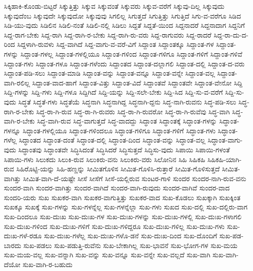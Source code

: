 {ಸಿಕ್ಕಿಹಾಕಿ-ಕೊಂಡು-ಬಿಟ್ಟರೆ
ಸಿಕ್ಕುತ್ತಿತ್ತು
ಸಿಕ್ಕುವ
ಸಿಕ್ಕುವಂತೆ
ಸಿಕ್ಕುವರು
ಸಿಕ್ಕುವ-ವರೆಗೆ
ಸಿಕ್ಕುವು-ದಿಲ್ಲ
ಸಿಕ್ಕುವುದು
ಸಿಕ್ಕುವುದೆಂಬ
ಸಿಕ್ಕುವುದೇ
ಸಿಕ್ಕುವುದೋ
ಸಿಕ್ಕುವುವು
ಸಿಗಲಿಲ್ಲ
ಸಿಗುತ್ತದೆ
ಸಿಗುತ್ತಿತ್ತು
ಸಿಗುತ್ತಿದೆ
ಸಿಗು-ವ-ವರೆಗೂ
ಸಿಡಿದ
ಸಿಡಿ-ಯು-ವುದು
ಸಿಡಿಲಿನ
ಸಿಡಿಲಿ-ನಂತೆ
ಸಿಡಿಲಿ-ನಲ್ಲಿ
ಸಿಡಿಲು
ಸಿದ್ದತೆ
ಸಿದ್ದತೆ-ಯಿಂದ
ಸಿದ್ದನಾದರೆ
ಸಿದ್ದನಾದಾಗ
ಸಿದ್ದನಿಗೆ
ಸಿದ್ದ-ರಾಗ-ಬೇಕು
ಸಿದ್ದ-ರಾಗಿ
ಸಿದ್ದ-ರಾಗಿ-ರ-ಬೇಕು
ಸಿದ್ದ-ರಾಗಿ-ರು-ವರು
ಸಿದ್ದ-ರಾಗುವರು
ಸಿದ್ದ-ರಾದರೆ
ಸಿದ್ದ-ರಾ-ದು-ದ-ರಿಂದ
ಸಿದ್ದಳಾಗಿ-ರುವಳು
ಸಿದ್ದ-ವಾಗಿದೆ
ಸಿದ್ದ-ವಾಗು-ವ-ವರೆ-ವಿಗೆ
ಸಿದ್ದಾಂತ
ಸಿದ್ದಾಂತಕ್ಕೂ
ಸಿದ್ದಾಂತ-ಗಳ
ಸಿದ್ದಾಂತ-ಗಳನ್ನು
ಸಿದ್ದಾಂತ-ಗಳಲ್ಲ
ಸಿದ್ದಾಂತ-ಗಳಲ್ಲಿಯೂ
ಸಿದ್ದಾಂತ-ಗಳಿಂದ
ಸಿದ್ದಾಂತ-ಗಳಿಗೂ
ಸಿದ್ದಾಂತ-ಗಳಿಗೆ
ಸಿದ್ದಾಂತ-ಗಳಿವೆ
ಸಿದ್ದಾಂತ-ಗಳು
ಸಿದ್ದಾಂತ-ಗಳೂ
ಸಿದ್ದಾಂತ-ಗಳೆಂದು
ಸಿದ್ದಾಂತದ
ಸಿದ್ದಾಂತ-ದಲ್ಲಾಗಲಿ
ಸಿದ್ದಾಂತ-ದಲ್ಲಿ
ಸಿದ್ದಾಂತ-ದ-ವರು
ಸಿದ್ದಾಂತ-ಪಡಿ-ಸಲು
ಸಿದ್ದಾಂತ-ಮಾಡಿ
ಸಿದ್ದಾಂತ-ವನ್ನು
ಸಿದ್ದಾಂತ-ವನ್ನೂ
ಸಿದ್ದಾಂತ-ವನ್ನೇ
ಸಿದ್ದಾಂತ-ವಲ್ಲ
ಸಿದ್ದಾಂತ-ವಾಗಿ-ರಲಿಲ್ಲ
ಸಿದ್ದಾಂತ-ವಾದ-ಹಾಗೆ
ಸಿದ್ದಾಂತ-ವಿತ್ತು
ಸಿದ್ದಾಂತ-ವಿದೆ
ಸಿದ್ದಾಂತವೆ
ಸಿದ್ದಾಂತವೇ
ಸಿದ್ದಾಂತ-ವೇನೋ
ಸಿದ್ದಿ
ಸಿದ್ದಿ-ಗಳನ್ನು
ಸಿದ್ದಿ-ಗಳು
ಸಿದ್ದಿ-ಗಳೂ
ಸಿದ್ದಿಗಿದೆ
ಸಿದ್ದಿ-ಯನ್ನು
ಸಿದ್ದಿ-ಸಲೇ-ಬೇಕು
ಸಿದ್ದಿ-ಸಿದ
ಸಿದ್ದಿ-ಸು-ವ-ವರೆಗೆ
ಸಿದ್ದಿ-ಸು-ವುದು
ಸಿದ್ಧತೆ
ಸಿದ್ಧತೆ-ಗಳು
ಸಿದ್ಧತೆಯೆ
ಸಿದ್ಧನಾಗಿ
ಸಿದ್ಧನಾಗಿದ್ದ
ಸಿದ್ಧನಾಗಿ-ದ್ದನು
ಸಿದ್ಧ-ನಾಗಿ-ರುವನು
ಸಿದ್ಧ-ಪಡಿ-ಸಲು
ಸಿದ್ಧ-ರಾಗಿ-ರ-ಬೇಕು
ಸಿದ್ಧ-ರಾ-ಗಿ-ರುವ
ಸಿದ್ಧ-ರಾ-ಗಿ-ರುವರು
ಸಿದ್ಧ-ರಾ-ಗಿ-ರುವರೋ
ಸಿದ್ಧ-ರಾ-ಗಿ-ರುವೆವು
ಸಿದ್ಧ-ವಾಗಿ
ಸಿದ್ಧ-ವಾಗಿ-ರ-ಬೇಕು
ಸಿದ್ಧ-ವಾಗಿ-ರುವ
ಸಿದ್ಧ-ವಾಗುತ್ತದೆ
ಸಿದ್ಧ-ವಾದದ್ದು
ಸಿದ್ಧಾಂತ
ಸಿದ್ಧಾಂತಕ್ಕೆ
ಸಿದ್ಧಾಂತ-ಗಳನ್ನು
ಸಿದ್ಧಾಂತ-ಗಳನ್ನೂ
ಸಿದ್ಧಾಂತ-ಗಳಲ್ಲಿಯೂ
ಸಿದ್ಧಾಂತ-ಗಳಿಂದಲೂ
ಸಿದ್ಧಾಂತ-ಗಳಿಗೂ
ಸಿದ್ಧಾಂತ-ಗಳಿಗೆ
ಸಿದ್ಧಾಂತ-ಗಳು
ಸಿದ್ಧಾಂತ-ಗಳೆಲ್ಲ
ಸಿದ್ಧಾಂತದ
ಸಿದ್ಧಾಂತ-ದಂತೆ
ಸಿದ್ಧಾಂತ-ದಲ್ಲಿ
ಸಿದ್ಧಾಂತ-ದಿಂದ
ಸಿದ್ಧಾಂತ-ವನ್ನು
ಸಿದ್ಧಾಂತ-ವಲ್ಲ
ಸಿದ್ಧಾಂತ-ವಾಗು-ವುದು
ಸಿದ್ಧಾಂತವು
ಸಿದ್ಧಾಂತವೇ
ಸಿದ್ಧಿಸಿದಂತೆ
ಸಿದ್ಧಿಸಿದರೆ
ಸಿದ್ಧಿಸುತ್ತದೆ
ಸಿದ್ಧಿಸು-ವುದು
ಸಿಪಾಯಿ
ಸಿಪಾಯಿ-ಗಳಂತೆ
ಸಿಪಾಯಿ-ಗಳು
ಸಿಲುಕದು
ಸಿಲುಕಿ-ರುವ
ಸಿಲುಕಿರು-ವನು
ಸಿಲುಕಿರು-ವರು
ಸಿಲೋನಿನ
ಸಿಹಿ
ಸಿಹಿಕಹಿ
ಸಿಹಿಕಹಿ-ಯಾಗಿ-ರುವ
ಸಿಹಿರೊಟ್ಟಿ-ಯನ್ನು
ಸಿಹಿ-ಹಣ್ಣನ್ನು
ಸೀಮಿತಗೊಳಿಸ
ಸೀಮಿತ-ಗೊಳಿಸಿ-ರುತ್ತಾರೆ
ಸೀಮಿತ-ಗೊಳಿಸುತ್ತದೆ
ಸೀಮಿತ-ವಾಗಿತ್ತು
ಸೀಮಿತ-ವಾಗಿ-ದೆ-ಯಷ್ಟೇ
ಸೀಸೆ
ಸೀಸೆಗೆ
ಸೀಸೆ-ಯಲ್ಲಿರುವ
ಸುಂಟರ-ಗಾಳಿ
ಸುಂದರ
ಸುಂದರ-ನಾಗಿ-ರುವ-ವನು
ಸುಂದರ-ವಾಗಿ
ಸುಂದರ-ವಾಗಿತ್ತು
ಸುಂದರ-ವಾಗಿದೆ
ಸುಂದರ-ವಾಗಿ-ರುವುದು
ಸುಂದರ-ವಾಗಿವೆ
ಸುಂದರ-ವಾದ
ಸುಂದರಿ-ಯರು
ಸುಖ
ಸುಖಕರ-ವಾಗಿ
ಸುಖಕರ-ವಾಗುತ್ತಿತ್ತು
ಸುಖಕರ-ವಾದ
ಸುಖ-ಕೊಡಲು
ಸುಖಕ್ಕಾಗಿ
ಸುಖಕ್ಕಿಂತ
ಸುಖಕ್ಕೂ
ಸುಖಕ್ಕೆ
ಸುಖ-ಗಳನ್ನು
ಸುಖ-ಗಳನ್ನೆಲ್ಲ
ಸುಖ-ಗಳನ್ನೆಲ್ಲಾ
ಸುಖ-ಗಳು
ಸುಖದ
ಸುಖ-ದಲ್ಲಿ
ಸುಖ-ದಲ್ಲಿರು-ವಾಗ
ಸುಖ-ದಿಂದಲೂ
ಸುಖ-ದುಃಖ
ಸುಖ-ದುಃಖ-ಗಳ
ಸುಖ-ದುಃಖ-ಗಳನ್ನು
ಸುಖ-ದುಃಖ-ಗಳಲ್ಲಿ
ಸುಖ-ದುಃಖ-ಗಳಾಗಲಿ
ಸುಖ-ದುಃಖ-ಗಳಿಂದ
ಸುಖ-ದುಃಖ-ಗಳಿಗೆ
ಸುಖ-ದುಃಖ-ಗಳಿದ್ದರೂ
ಸುಖ-ದುಃಖ-ಗಳಿಲ್ಲ
ಸುಖ-ದುಃಖ-ಗಳು
ಸುಖ-ದುಃಖ-ಗಳೆ-ರಡೂ
ಸುಖ-ದುಃಖ-ಗಳೆಲ್ಲ
ಸುಖ-ದುಃಖ-ಗಳೊ-ಡನೆ
ಸುಖ-ದುಃಖ-ದಿಂದ
ಸುಖ-ದೊಂದಿಗೆ
ಸುಖ-ಪಡ-ಬಾರದು
ಸುಖ-ಪಡಲು
ಸುಖ-ಪಡುತ್ತಿ-ರುವೆನು
ಸುಖ-ಬೇಕಾಗಿಲ್ಲ
ಸುಖ-ಭಾವನೆ
ಸುಖ-ಭೋಗ-ಗಳ
ಸುಖ-ಮಯ
ಸುಖ-ಮಯ-ವಲ್ಲ
ಸುಖ-ವನ್ನಾಗಿ
ಸುಖ-ವನ್ನು
ಸುಖ-ವನ್ನೂ
ಸುಖ-ವನ್ನೇ
ಸುಖ-ವಲ್ಲದೆ
ಸುಖ-ವಾಗಿ
ಸುಖ-ವಾಗಿ-ದೆಯೋ
ಸುಖ-ವಾಗಿ-ರ-ಬಹುದು
}
